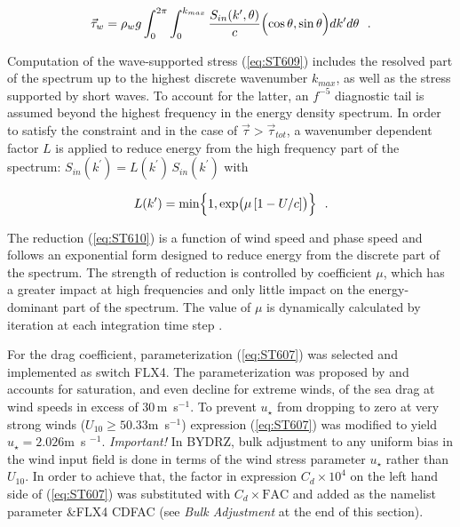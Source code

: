 \begin{equation}\label{eq:ST609}
   \vec{\tau}_w = \rho_w g \int_{0}^{2\pi} \int_{0}^{k_{max}}
   \frac{S_{in}(k^\prime,\theta)}{c} \Bigl (\cos\theta,\sin\theta \Bigr )
   dk^\prime d\theta \:\:\: .
\end{equation}

\noindent
Computation of the wave-supported stress (\ref{eq:ST609}) includes the
resolved part of the spectrum up to the highest discrete wavenumber $k_{max}$,
as well as the stress supported by short waves. To account for the latter,
an $f^{-5}$ diagnostic tail is assumed beyond the highest frequency in the
energy density spectrum. In order to satisfy the constraint and in the case
of $\vec{\tau} > \vec{\tau}_{tot}$, a wavenumber dependent factor $L$ is
applied to reduce energy from the high frequency part of the spectrum:
$S_{in}(k^\prime)=L(k^\prime)\,S_{in}(k^\prime)$ with

\begin{equation}\label{eq:ST610}
L(k^\prime) = \min \Bigl \{ 1, \exp \bigl ( \mu\,[1- U/c] \bigr ) \Bigr
\}  \:\:\: .
\end{equation}

\noindent
The reduction (\ref{eq:ST610}) is a function of wind speed and phase speed and
follows an exponential form designed to reduce energy from the discrete part
of the spectrum. The strength of reduction is controlled by coefficient $\mu$,
which has a greater impact at high frequencies and only little impact on the
energy-dominant part of the spectrum. The value of $\mu$ is dynamically
calculated by iteration at each integration time step \citep{art:Tea10}.

For the drag coefficient, parameterization (\ref{eq:ST607}) was selected and
implemented as switch {\code FLX4}. The parameterization was proposed by
\citet{art:Hwa11} and accounts for saturation, and even decline 
for extreme winds, of the sea drag at wind speeds in excess of 30\,m~s$^{-1}$.
To prevent $u_\star$ from dropping to zero at very strong winds
($U_{10}\ge50.33$m~s$^{-1}$) expression (\ref{eq:ST607}) was modified to yield
$u_\star=2.026$m~s $^{-1}$. {\it Important!} In BYDRZ, bulk adjustment to any
uniform bias in the wind input field is done in terms of the wind stress
parameter $u_\star$ rather than $U_{10}$. In order to achieve that, the
factor in expression $C_d \times 10^4$ on the left hand side of
(\ref{eq:ST607}) was substituted with $C_d \times \mathrm{FAC}$ and added
as the namelist parameter {\code \&FLX4 CDFAC} (see {\it Bulk Adjustment}
at the end of this section).

